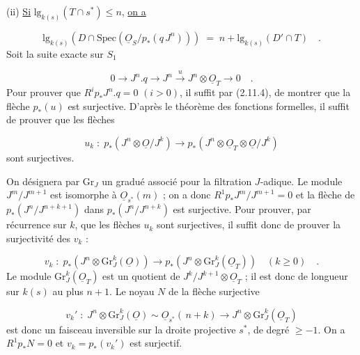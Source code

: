 
(ii)  \underline{Si} $\mathrm{lg}_{k(s)} (T \cap s^*) \leq n$, \underline{on a}

\begin{equation*}
\mathrm{lg}_{k(s)} (D \cap \mathrm{Spec}(\underline{O}_S/p_*(q\,J^n))) \; = \; n + \mathrm{lg}_{k(s)} (D' \cap T) \quad .
\end{equation*}
Soit la suite exacte sur $S_1$

\begin{equation}\tag{2.14.1}
0 \longrightarrow J^n. q \longrightarrow J^n \stackrel{u}{\longrightarrow} J^n \otimes \underline{O}_T \longrightarrow 0 \quad .
\end{equation}
Pour prouver que $R^ip_* J^n.q = 0$  $(i > 0)$, il suffit par (2.11.4), de montrer que la flèche $p_*(u)$ est surjective. D'après le théorème des fonctions formelles, il suffit de prouver que les flèches

\begin{equation*}
u_k \; : \; p_*(J^n \otimes \underline{O}/J^k) \longrightarrow p_*(J^n \otimes \underline{O}_T \otimes \underline{O}/J^k)
\end{equation*}
sont surjectives.

On désignera par $\mathrm{Gr}_J$ un gradué associé pour la filtration $J$-adique. Le module $J^m/J^{m+1}$ est isomorphe à $\underline{O}_{s^*}(m)$ ; on a donc $R^1p_*J^m/J^{m+1} = 0$ et la flèche de $p_*(J^n/J^{n+k+1})$ dans $p_*(J^n/J^{n+k})$ est surjective. Pour prouver, par récurrence sur $k$, que les flèches $u_k$ sont surjectives, il suffit donc de prouver la surjectivité des $v_k$ :

\begin{equation*}
v_k \; : \; p_*(J^n \otimes \mathrm{Gr}_J^k(\underline{O})) \longrightarrow p_*(J^n \otimes \mathrm{Gr}_J^k(\underline{O}_T)) \quad (k \geq 0) \quad .
\end{equation*}
Le module $\mathrm{Gr}_J^k(\underline{O}_T)$ est un quotient de $J^k/J^{k+1} \otimes \underline{O}_T$ ; il est donc de longueur sur $k(s)$ au plus $n+1$. Le noyau $N$ de la flèche surjective

\begin{equation*}
v_k' \; : \; J^n \otimes \mathrm{Gr}_J^k(\underline{O}) \sim \underline{O}_{s^*}(\,n+k) \longrightarrow J^n \otimes \mathrm{Gr}_J^k(\underline{O}_T)
\end{equation*}
est donc un faisceau inversible sur la droite projective $s^*$, de degré $\geq -1$. On a $R^1p_* N = 0$ et $v_k = p_*(v_k')$ est surjectif.

